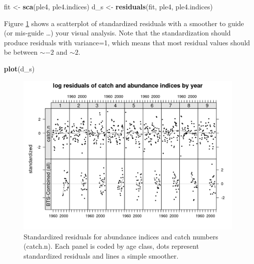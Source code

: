 \documentclass[
]{book}
\newenvironment{Shaded}{\begin{snugshade}}{\end{snugshade}}
\newcommand{\FunctionTok}[1]{\textcolor[rgb]{0.13,0.29,0.53}{\textbf{#1}}}
\newcommand{\NormalTok}[1]{#1}
\newcommand{\OtherTok}[1]{\textcolor[rgb]{0.56,0.35,0.01}{#1}}
\begin{document}
\begin{Shaded}
\begin{Highlighting}[]
\NormalTok{fit }\OtherTok{\textless{}{-}} \FunctionTok{sca}\NormalTok{(ple4, ple4.indices)}
\NormalTok{d\_s }\OtherTok{\textless{}{-}} \FunctionTok{residuals}\NormalTok{(fit, ple4, ple4.indices)}
\end{Highlighting}
\end{Shaded}

Figure \ref{fig:res} shows a scatterplot of standardized residuals with a smoother to guide (or mis-guide \ldots) your visual analysis. Note that the standardization should produce residuals with variance=1, which means that most residual values should be between \(\sim -2\) and \(\sim 2\).

\begin{Shaded}
\begin{Highlighting}[]
\FunctionTok{plot}\NormalTok{(d\_s)}
\end{Highlighting}
\end{Shaded}

\begin{figure}
\centering
\includegraphics{_bookdown_files/_main_files/figure-html/res-1.png}
\caption{\label{fig:res}Standardized residuals for abundance indices and catch numbers (catch.n). Each panel is coded by age class, dots represent standardized residuals and lines a simple smoother.}
\end{figure}
\end{document}
